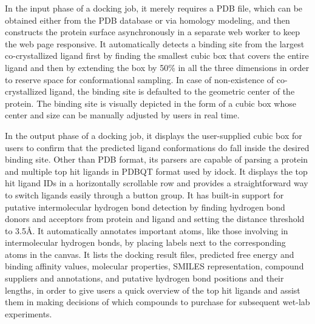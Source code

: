 In the input phase of a docking job, it merely requires a PDB file, which can be obtained either from the PDB database \citep{1357} or via homology modeling, and then constructs the protein surface asynchronously in a separate web worker to keep the web page responsive. It automatically detects a binding site from the largest co-crystallized ligand first by finding the smallest cubic box that covers the entire ligand and then by extending the box by 50\% in all the three dimensions in order to reserve space for conformational sampling. In case of non-existence of co-crystallized ligand, the binding site is defaulted to the geometric center of the protein. The binding site is visually depicted in the form of a cubic box whose center and size can be manually adjusted by users in real time.

In the output phase of a docking job, it displays the user-supplied cubic box for users to confirm that the predicted ligand conformations do fall inside the desired binding site. Other than PDB format, its parsers are capable of parsing a protein and multiple top hit ligands in PDBQT format used by idock. It displays the top hit ligand IDs in a horizontally scrollable row and provides a straightforward way to switch ligands easily through a button group. It has built-in support for putative intermolecular hydrogen bond detection by finding hydrogen bond donors and acceptors from protein and ligand and setting the distance threshold to 3.5\AA. It automatically annotates important atoms, like those involving in intermolecular hydrogen bonds, by placing labels next to the corresponding atoms in the canvas. It lists the docking result files, predicted free energy and binding affinity values, molecular properties, SMILES representation, compound suppliers and annotations, and putative hydrogen bond positions and their lengths, in order to give users a quick overview of the top hit ligands and assist them in making decisions of which compounds to purchase for subsequent wet-lab experiments.

